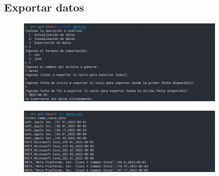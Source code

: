 \documentclass{article}
\begin{document}
\subsection{Exportar datos}
\begin{figure}[H]
\centering
\includegraphics[width=0.9\textwidth]{img/exportacion_de_datos_1.png}
\end{figure}

\begin{figure}[H]
\centering
\includegraphics[width=0.9\textwidth]{img/exportacion_de_datos_2.png}
\end{figure}
\end{document}
